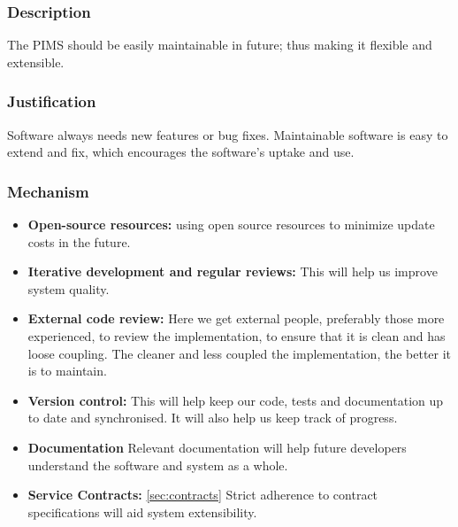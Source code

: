 \subsubsection*{Description}
The PIMS should be easily maintainable in future; thus making it flexible and extensible.
		
\subsubsection*{Justification}
Software always needs new features or bug fixes. Maintainable software is easy to extend and fix, which encourages the software's uptake and use.
	
\subsubsection*{Mechanism}
	\begin{itemize}
		\item \textbf{Open-source resources:} using open source resources to minimize update costs in the future.
		\item \textbf{Iterative development and regular reviews:} This will help us improve system quality.
		\item \textbf{External code review:} Here we get external people, preferably those more experienced, to review the implementation, to ensure that it is clean and has loose coupling. The cleaner and less coupled the implementation, the better it is to maintain.
		\item \textbf{Version control:} This will help keep our code, tests and documentation up to date and synchronised. It will also help us keep track of progress.
		\item \textbf{Documentation} Relevant documentation will help future developers understand the software and system as a whole.
		\item \textbf{Service Contracts:} \ref{sec:contracts} Strict adherence to contract specifications will aid system extensibility.
	\end{itemize}
